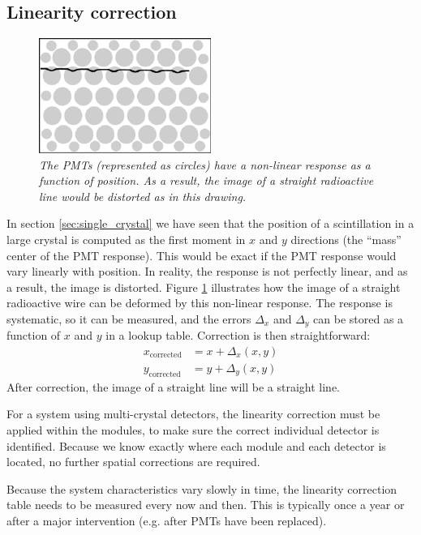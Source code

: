\documentclass[11pt,oneside]{book}
\begin{document}
\subsection{Linearity correction}
\begin{figure}[tb]
\centering
\includegraphics[width=0.5\textwidth]{figs/fig_linearity.pdf}
\caption{\label{fig:linearity} \emph{The PMTs (represented as circles) have a
non-linear response as a function of position. As a result, the image of a
straight radioactive line would be distorted as in this drawing.}}
\end{figure}

In section \ref{sec:single_crystal} we have seen that the position of
a scintillation in a large crystal is computed as the first moment in
$x$ and $y$ directions (the ``mass'' center of the PMT response). This
would be exact if the PMT response would vary linearly with
position. In reality, the response is not perfectly linear, and as a
result, the image is distorted. Figure \ref{fig:linearity} illustrates
how the image of a straight radioactive wire can be deformed by this
non-linear response. The response is systematic, so it can be
measured, and the errors $\Delta_x$ and $\Delta_y$ can be stored as a
function of $x$ and $y$ in a lookup table. Correction is then
straightforward:
\begin{align}
 x_{\text{corrected}} &= x + \Delta_x(x,y) \nonumber \\
 y_{\text{corrected}} &= y + \Delta_y(x,y)
\end{align}
After correction, the image of a straight line will be a straight line.

For a system using multi-crystal detectors, the linearity correction must be
applied within the modules, to make sure the correct individual detector is
identified. Because we know exactly where each module and each detector is
located, no further spatial corrections are required.

Because the system characteristics vary slowly in time, the linearity
correction table needs to be measured every now and then. This is typically
once a year or after a major intervention (e.g. after PMTs have been
replaced).
\end{document}
